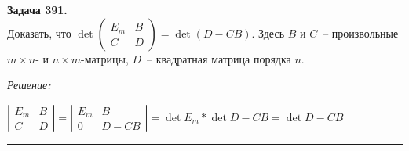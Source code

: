 \documentclass[a4paper, 12pt]{article}
\newenvironment{problem}[2][Задача]
    { \begin{mdframed}[backgroundcolor=gray!10] \textbf{#1 #2.} \\}
    {  \end{mdframed}}
\newenvironment{solution}
    {\textit{Решение: }}
    {\noindent\rule{7in}{1.5pt}}
\begin{document}
\begin{problem}{391}
Доказать, что $\det\left(\begin{array}{cc}E_m & B\\C & D\end{array}\right)=\det(D-CB)$.
Здесь $B$ и $C$~-- произвольные $m\times n$- и $n\times m$-матрицы, $D$~-- квадратная матрица порядка $n$.
\end{problem}
\begin{solution}

$
\left|
\begin{array}{rr}
  E_m & B \\
  C   & D
\end{array}
\right|
=
\left|
\begin{array}{rr}
  E_m & B \\
  0   & D - CB
\end{array}
\right|
= \det{E_m}*\det{D-CB}
= \det{D-CB}
$

\end{solution} 

\end{document}
